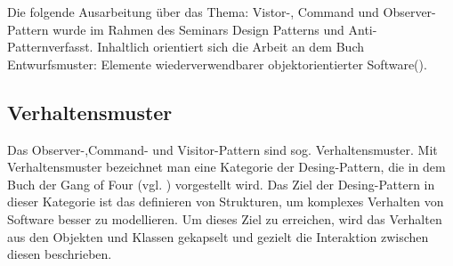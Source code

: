 Die folgende Ausarbeitung über das Thema: Vistor-, Command und Observer-Pattern wurde im Rahmen des Seminars \glqq Design Patterns und Anti-Pattern\grqq verfasst. Inhaltlich orientiert sich die Arbeit an dem Buch \glqq Entwurfsmuster: Elemente wiederverwendbarer objektorientierter Software\grqq (\cite{GOF95}).


\subsection{Verhaltensmuster}

Das Observer-,Command- und Visitor-Pattern sind sog. Verhaltensmuster.
Mit Verhaltensmuster bezeichnet man eine Kategorie der Desing-Pattern, die in dem Buch der Gang of Four (vgl. \cite{GOF95}) vorgestellt wird. Das Ziel der Desing-Pattern in dieser Kategorie ist das definieren von Strukturen, um komplexes Verhalten von Software besser zu modellieren. Um dieses Ziel zu erreichen, wird das Verhalten aus den Objekten und Klassen gekapselt und gezielt die Interaktion zwischen diesen beschrieben.


